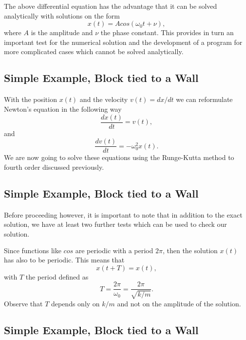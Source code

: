 \documentclass[%
oneside,                 %
final,                   %
10pt]{article}
\begin{document}
The above differential equation has the advantage that it can be solved  analytically with solutions on the form
  \[
     x(t)=Acos(\omega_0t+\nu),
  \]
where $A$ is the amplitude and $\nu$ the phase constant.   This provides in turn an important test for the numerical
solution and the development of a program for more complicated cases which cannot be solved analytically.




\subsection*{Simple Example, Block tied to a Wall}

\paragraph{}
With the position $x(t)$ and the velocity  $v(t)=dx/dt$ we can reformulate Newton's equation in the following way
  \[
      \frac{dx(t)}{dt}=v(t),
  \]
  and
  \[
      \frac{dv(t)}{dt}=-\omega_0^2x(t).
  \]
  We are now going to solve these equations using the Runge-Kutta method
  to fourth order discussed previously.



\subsection*{Simple Example, Block tied to a Wall}

\paragraph{}
Before proceeding however, it is important to note that in addition to the exact solution, we have at least two further tests which can be used to check our solution. 

Since functions like $cos$ are periodic with a period $2\pi$, then the solution $x(t)$ has also to be periodic. This means that
\[
     x(t+T)=x(t),
\]
with $T$ the period defined as 
\[
     T=\frac{2\pi}{\omega_0}=\frac{2\pi}{\sqrt{k/m}}.
\]
Observe that $T$ depends only on $k/m$ and not on the amplitude of the solution.



\subsection*{Simple Example, Block tied to a Wall}
\end{document}
